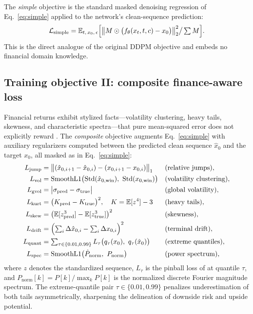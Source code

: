 ﻿\documentclass[12pt,letterpaper]{article}
\begin{document}
The \emph{simple} objective is the standard masked denoising regression of
Eq.~\eqref{eq:simple} applied to the network's clean-sequence prediction:
\begin{equation}
\mathcal{L}_{\mathrm{simple}}
= \mathbb{E}_{t,\,x_0,\,\epsilon}
\Bigl[\bigl\| M \odot \bigl(f_\theta(x_t, t, c) - x_0\bigr) \bigr\|_2^2
\big/ \textstyle\sum M \Bigr].
\label{eq:simple}
\end{equation}
This is the direct analogue of the original DDPM objective and embeds no
financial domain knowledge.

\subsection{Training objective II: composite finance-aware loss}\label{sec:complexloss}

Financial returns exhibit stylized facts---volatility clustering, heavy
tails, skewness, and characteristic spectra---that pure mean-squared error
does not explicitly reward \citep{cont2001empirical}. The \emph{composite}
objective augments Eq.~\eqref{eq:simple} with auxiliary regularizers
computed between the predicted clean sequence $\hat x_0$ and the target
$x_0$, all masked as in Eq.~\eqref{eq:simple}:
\begin{align}
L_{\mathrm{jump}} &= \bigl\| (\hat x_{0,i+1} - \hat x_{0,i}) -
(x_{0,i+1} - x_{0,i}) \bigr\|_1
&& \text{(relative jumps)}, \\
L_{\mathrm{vol}} &= \mathrm{SmoothL1}\bigl(\mathrm{Std}(\hat
x_{0,\mathrm{win}}),\ \mathrm{Std}(x_{0,\mathrm{win}})\bigr)
&& \text{(volatility clustering)}, \\
L_{\mathrm{gvol}} &= \bigl|\sigma_{\mathrm{pred}} -
\sigma_{\mathrm{true}}\bigr|
&& \text{(global volatility)}, \\
L_{\mathrm{kurt}} &= \bigl(K_{\mathrm{pred}} - K_{\mathrm{true}}\bigr)^2,
\quad K = \mathbb{E}[z^4] - 3
&& \text{(heavy tails)}, \\
L_{\mathrm{skew}} &= \bigl(\mathbb{E}[z_{\mathrm{pred}}^3] -
\mathbb{E}[z_{\mathrm{true}}^3]\bigr)^2
&& \text{(skewness)}, \\
L_{\mathrm{drift}} &= \Bigl(\textstyle\sum_i \Delta\hat x_{0,i} -
\sum_i \Delta x_{0,i}\Bigr)^2
&& \text{(terminal drift)}, \\
L_{\mathrm{quant}} &= \textstyle\sum_{\tau \in \{0.01, 0.99\}}
L_\tau\bigl(q_\tau(x_0),\ q_\tau(\hat x_0)\bigr)
&& \text{(extreme quantiles)}, \\
L_{\mathrm{spec}} &= \mathrm{SmoothL1}\bigl(\hat P_{\mathrm{norm}},\
P_{\mathrm{norm}}\bigr)
&& \text{(power spectrum)},
\end{align}
where $z$ denotes the standardized sequence, $L_\tau$ is the pinball loss of
\citet{wang2019pinball} at quantile $\tau$, and
$P_{\mathrm{norm}}[k] = P[k]/\max_k P[k]$ is the normalized discrete Fourier
magnitude spectrum. The extreme-quantile pair $\tau \in \{0.01, 0.99\}$
penalizes underestimation of both tails asymmetrically, sharpening the
delineation of downside risk and upside potential.
\end{document}
